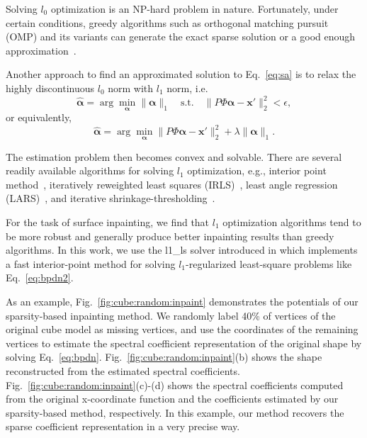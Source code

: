 Solving $l_0$ optimization is an NP-hard problem in nature.
Fortunately, under certain conditions, greedy algorithms such as
orthogonal matching pursuit (OMP) and its variants can generate the
exact sparse solution or a good enough
approximation~\cite{Needell2010,Tropp2007}.

Another approach to find an approximated solution to Eq.~\ref{eq:sa}
is to relax the highly discontinuous $l_0$ norm with $l_1$ norm, i.e.
\begin{equation}
\label{eq:bpdn}
\hat{\mathbf{\alpha}} = \arg\min_{\mathbf{\alpha}} \|\mathbf{\alpha}\|_1 \quad \text{s.t.} \quad \|P\Phi\mathbf{\alpha} - \mathbf{x}'\|_2^2 < \epsilon,
\end{equation}
or equivalently,
\begin{equation}
\label{eq:bpdn2}
\hat{\mathbf{\alpha}} = \arg\min_{\mathbf{\alpha}} \|P\Phi\mathbf{\alpha} - \mathbf{x}'\|_2^2 + \lambda\|\mathbf{\alpha}\|_1.
\end{equation}

The estimation problem then becomes convex and solvable. There are
several readily available algorithms for solving $l_1$ optimization,
e.g., interior point method~\cite{Kim2007}, iteratively reweighted
least squares (IRLS)~\cite{Holland1977}, least angle regression
(LARS)~\cite{Sorkine2004}, and iterative
shrinkage-thresholding~\cite{Daubechies2004}.

For the task of surface inpainting, we find that $l_1$ optimization algorithms tend to be
more robust and generally produce better inpainting results than greedy algorithms. In this work,
we use the l1\_ls solver introduced in \cite{Kim2007} which implements a fast interior-point method
for solving $l_1$-regularized least-square problems like Eq.~\ref{eq:bpdn2}.

As an example, Fig.~\ref{fig:cube:random:inpaint} demonstrates the
potentials of our sparsity-based inpainting method. We randomly label
40\% of vertices of the original cube model as missing vertices, and
use the coordinates of the remaining vertices to estimate the spectral
coefficient representation of the original shape by solving
Eq.~\ref{eq:bpdn}. Fig.~\ref{fig:cube:random:inpaint}(b) shows the
shape reconstructed from the estimated spectral coefficients.
Fig.~\ref{fig:cube:random:inpaint}(c)-(d) shows the spectral
coefficients computed from the original x-coordinate function and the
coefficients estimated by our sparsity-based method, respectively. In
this example, our method recovers the sparse coefficient
representation in a very precise way.


